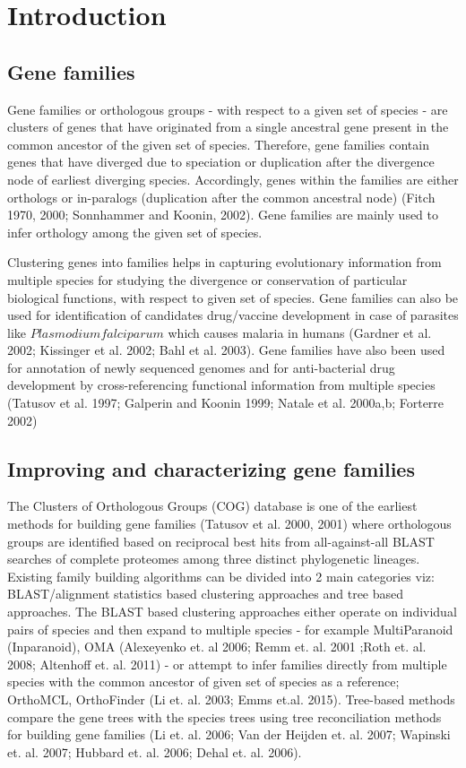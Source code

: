 \documentclass{article}
\begin{document}
	
	\section{Introduction}
		\subsection{Gene families}
		Gene families or orthologous groups - with respect to a given set of species - are clusters of genes that have originated from a single ancestral gene present in the common ancestor of the given set of species. Therefore, gene families contain genes that have diverged due to speciation or duplication after the divergence node of earliest diverging species. Accordingly, genes within the families are either orthologs or in-paralogs (duplication after the common ancestral node) (Fitch 1970, 2000; Sonnhammer and Koonin, 2002). Gene families are mainly used to infer orthology among the given set of species.
		
		Clustering genes into families helps in capturing evolutionary information from multiple species for studying the divergence or conservation of particular biological functions, with respect to given set of species. Gene families can also be used for identification of candidates drug/vaccine development in case of parasites like $Plasmodium falciparum$ which causes malaria in humans (Gardner et al. 2002; Kissinger et al. 2002; Bahl et al. 2003). Gene families have also been used for annotation of newly sequenced genomes and for anti-bacterial drug development by cross-referencing functional information from multiple species (Tatusov et al. 1997; Galperin and Koonin 1999; Natale et al. 2000a,b; Forterre 2002)
		
		\subsection{Improving and characterizing gene families}
		The Clusters of Orthologous Groups (COG) database is one of the earliest methods for building gene families (Tatusov et al. 2000, 2001) where orthologous groups are identified based on reciprocal best hits from all-against-all BLAST searches of complete proteomes among three distinct phylogenetic lineages. Existing family building algorithms can be divided into 2 main categories viz: BLAST/alignment statistics based clustering approaches and tree based approaches. The BLAST based clustering approaches either operate on individual pairs of species and then expand to multiple species - for example MultiParanoid (Inparanoid), OMA (Alexeyenko et. al 2006; Remm et. al. 2001 ;Roth et. al. 2008; Altenhoff et. al. 2011) - or attempt to infer families directly from multiple species with the common ancestor of given set of species as a reference;  OrthoMCL, OrthoFinder (Li et. al. 2003; Emms et.al. 2015). Tree-based methods compare the gene trees with the species trees using tree reconciliation methods for building gene families (Li et. al. 2006; Van der Heijden et. al. 2007; Wapinski et. al. 2007; Hubbard et. al. 2006; Dehal et. al. 2006).
		  
\end{document}
